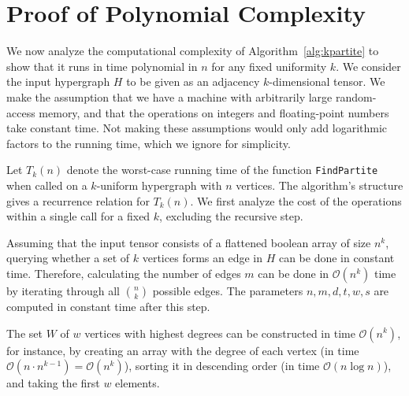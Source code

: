 \documentclass{amsart}
\newcommand{\bigO}[1]{\ensuremath{\mathcal{O}\left(#1\right)}}
\begin{document}
\section{Proof of Polynomial Complexity}\label{sec:complexity}

We now analyze the computational complexity of Algorithm~\ref{alg:kpartite} to show that it runs in time polynomial in $n$ for any fixed uniformity $k$.
We consider the input hypergraph $H$ to be given as an adjacency $k$-dimensional tensor.
We make the assumption that we have a machine with arbitrarily large random-access memory,
and that the operations on integers and floating-point numbers take constant time.
Not making these assumptions would only add logarithmic factors to the running time, which we ignore for simplicity.

Let $T_k(n)$ denote the worst-case running time of the function \texttt{FindPartite} when called on a $k$-uniform hypergraph with $n$ vertices.
The algorithm's structure gives a recurrence relation for $T_k(n)$.
We first analyze the cost of the operations within a single call for a fixed $k$, excluding the recursive step.

Assuming that the input tensor consists of a flattened boolean array of size $n^k$,
querying whether a set of $k$ vertices forms an edge in $H$ can be done in constant time.
Therefore, calculating the number of edges $m$ can be done in $\bigO{n^k}$ time by iterating through all $\binom{n}{k}$ possible edges.
The parameters $n, m, d, t, w, s$ are computed in constant time after this step.

The set $W$ of $w$ vertices with highest degrees can be constructed in time $\bigO{n^k}$, for instance, by
creating an array with the degree of each vertex (in time  $\bigO{n \cdot n^{k-1}} = \bigO{n^k}$),
sorting it in descending order (in time $\bigO{n \log n}$),
and taking the first $w$ elements.
\end{document}
